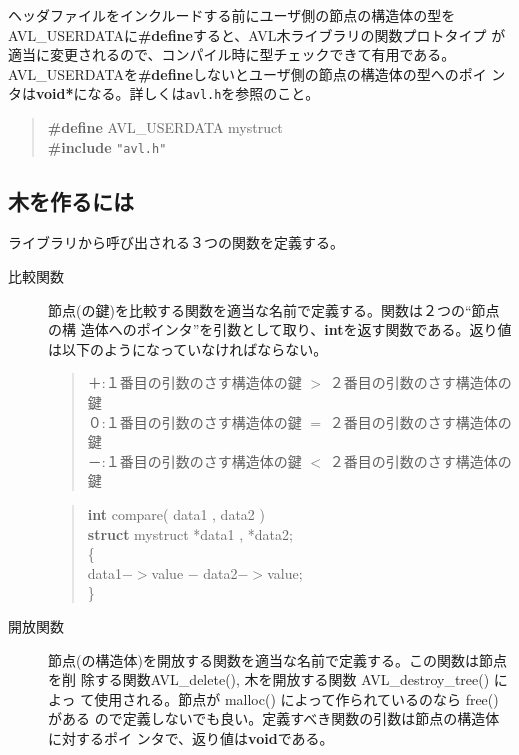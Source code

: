 ヘッダファイルをインクルードする前にユーザ側の節点の構造体の型を
AVL\_USERDATAに{\bf\#define}すると、AVL木ライブラリの関数プロトタイプ
が適当に変更されるので、コンパイル時に型チェックできて有用である。
AVL\_USERDATAを{\bf\#define}しないとユーザ側の節点の構造体の型へのポイ
ンタは{\bf void*}になる。詳しくは\verb+avl.h+を参照のこと。
\begin{quote}
{\bf\#define} AVL\_USERDATA mystruct\\
{\bf\#include} \verb+"avl.h"+
\end{quote}

\subsection{木を作るには}
ライブラリから呼び出される３つの関数を定義する。
\label{user-function}
\begin{description}
\item[比較関数]
節点(の鍵)を比較する関数を適当な名前で定義する。関数は２つの``節点の構
造体へのポインタ''を引数として取り、{\bf int}を返す関数である。返り値
は以下のようになっていなければならない。
\begin{quote}
＋:１番目の引数のさす構造体の鍵 $>$ ２番目の引数のさす構造体の鍵\\
０:１番目の引数のさす構造体の鍵 $=$ ２番目の引数のさす構造体の鍵\\
－:１番目の引数のさす構造体の鍵 $<$ ２番目の引数のさす構造体の鍵
\end{quote}

\begin{quote}
{\bf int} compare( data1 , data2 )\\
{\bf struct} mystruct *data1 , *data2;\\
\{\\
\hspace*{1cm}{\bf return} data1$->$value $-$ data2$->$value;\\
\}
\end{quote}

\item[開放関数]
節点(の構造体)を開放する関数を適当な名前で定義する。この関数は節点を削
除する関数AVL\_delete(), 木を開放する関数 AVL\_destroy\_tree() によっ
て使用される。節点が malloc() によって作られているのなら free() がある
ので定義しないでも良い。定義すべき関数の引数は節点の構造体に対するポイ
ンタで、返り値は{\bf void}である。


\end{description}
